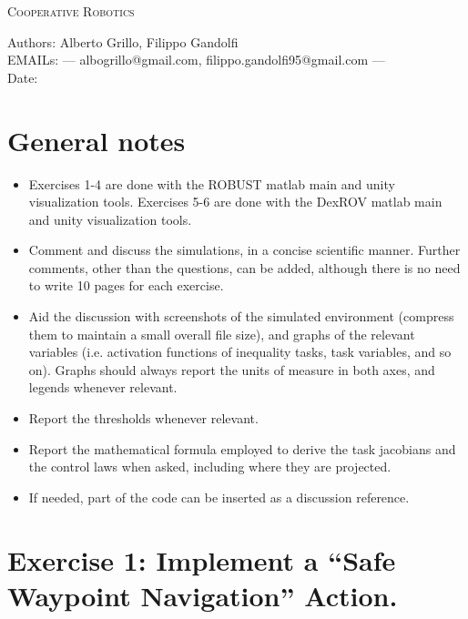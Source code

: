\documentclass{article}
\makeatletter
\newcommand\frontmatter{%
    \cleardoublepage
  \pagenumbering{roman}}
\newcommand\mainmatter{%
    \cleardoublepage
  \pagenumbering{arabic}}
\makeatother
\begin{document}
\frontmatter
\onecolumn 
\vskip 1cm
\begin{center}
\huge \textsc{Cooperative Robotics}\\
\vskip 1cm

\skip 0.5cm

\vskip 5cm

\normalsize
Authors: Alberto Grillo, Filippo Gandolfi\\
EMAILs: --- albogrillo@gmail.com, filippo.gandolfi95@gmail.com ---\\
Date:  \\
\end{center}
\clearpage
\mainmatter
\section*{General notes}

\begin{itemize}
	\item Exercises 1-4 are done with the ROBUST matlab main and unity visualization tools. Exercises 5-6 are done with the DexROV matlab main and unity visualization tools.
	\item Comment and discuss the simulations, in a concise scientific manner. Further comments, other than the questions, can be added, although there is no need to write 10 pages for each exercise.
	\item Aid the discussion with screenshots of the simulated environment (compress them to maintain a small overall file size), and graphs of the relevant variables (i.e. activation functions of inequality tasks, task variables, and so on). Graphs should always report the units of measure in both axes, and legends whenever relevant.
	\item Report the thresholds whenever relevant.
	\item Report the mathematical formula employed to derive the task jacobians and the control laws when asked, including where they are projected.
	\item If needed, part of the code can be inserted as a discussion reference.
\end{itemize} 

\clearpage


\section{Exercise 1: Implement a “Safe Waypoint Navigation” Action.}
\end{document}
